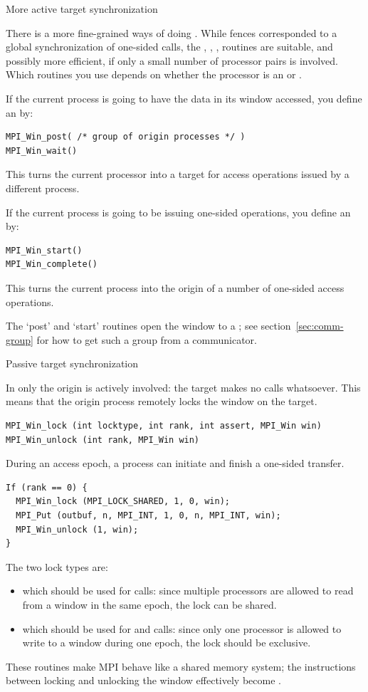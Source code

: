  {More active target synchronization}

There is a more fine-grained ways of doing 
. While fences
corresponded to a global synchronization of one-sided calls,
the ,
, ,  routines
are suitable, and possibly more efficient,
if only a small number of processor pairs is
involved.  Which routines
you use depends on whether the processor is an  or
.

If the current process is going to have the data in its window accessed,
you define an  by:
\begin{verbatim}
MPI_Win_post( /* group of origin processes */ )
MPI_Win_wait()
\end{verbatim}
This turns the current processor into a target for access operations issued
by a different process.

If the current process is going to be issuing one-sided operations,
you define an  by:
\begin{verbatim}
MPI_Win_start()
MPI_Win_complete()
\end{verbatim}
This turns the current process into the origin of a number of
one-sided access operations.

The `post' and `start' routines open the window to a
; see section~\ref{sec:comm-group}
for how to get such a group from a communicator.

 {Passive target synchronization}

In  only the origin is
actively involved: the target makes no calls whatsoever.
This means that the origin process remotely locks the window
on the target.
\begin{verbatim}
MPI_Win_lock (int locktype, int rank, int assert, MPI_Win win)
MPI_Win_unlock (int rank, MPI_Win win)
\end{verbatim}
During an access epoch, a process can initiate and finish a one-sided
transfer.
\begin{verbatim}
If (rank == 0) {
  MPI_Win_lock (MPI_LOCK_SHARED, 1, 0, win);
  MPI_Put (outbuf, n, MPI_INT, 1, 0, n, MPI_INT, win);
  MPI_Win_unlock (1, win);
}
\end{verbatim}
The two lock types are:
\begin{itemize}
\item {} which should be used for 
  calls: since multiple processors are allowed to read from a window
  in the same epoch, the lock can be shared.
\item {} which should be used for
   and  calls: since only one processor is
  allowed to write to a window during one epoch, the lock should be
  exclusive.
\end{itemize}
These routines make MPI behave like a shared memory system; the
instructions between locking and unlocking the window effectively
become .

